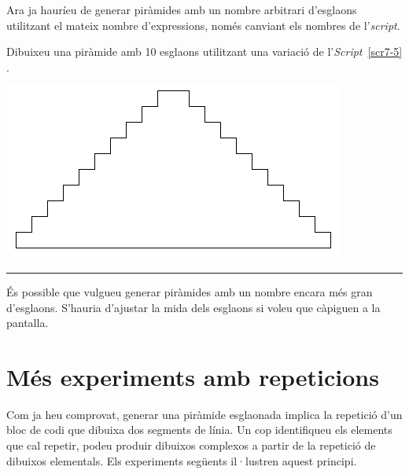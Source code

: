 Ara ja hauríeu de generar piràmides amb un nombre arbitrari d'esglaons utilitzant el mateix nombre d'expressions, només canviant els nombres de l'\emph{script}.

\begin{center}
\colorbox{black}{}
\end{center}
{\small
\noindent
Dibuixeu una piràmide amb 10 esglaons utilitzant una variació de l'\emph{Script}~\ref{scr7-5} .}
\begin{center}
\includegraphics[scale=0.27]{Imatges/figuraE7-5.png} 
\end{center}
\noindent
\rule{\textwidth}{3pt}
\vspace{3mm}

És possible que vulgueu generar piràmides amb un nombre encara més gran d'esglaons. S'hauria d'ajustar la mida dels esglaons si voleu que càpiguen a la pantalla.

\section{Més experiments amb repeticions}
Com ja heu comprovat, generar una piràmide esglaonada implica la repetició d'un bloc de codi que dibuixa dos segments de línia. Un cop identifiqueu els elements que cal repetir, podeu produir dibuixos complexos a partir de la repetició de dibuixos elementals. Els experiments següents il·lustren aquest principi.

